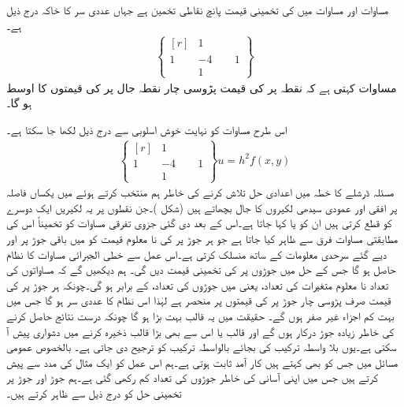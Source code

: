 مساوات  اور مساوات  میں  کی تخمینی قیمت پانچ نقاطی تخمین ہے جہاں  عددی سر کا خاکہ درج ذیل ہے۔
\begin{align}\label{مساوات_اعدادی_جزوی_عمومی_ح}
\left \{ \begin{matrix*}[r] &1&\\1&-4&\phantom{-}1\\&1& \end{matrix*}\right \}
\end{align}
مساوات  کہتی ہے کہ نقطہ  پر  کی قیمت  پڑوسی چار نقطہ جال پر  کی قیمتوں کا اوسط ہو گا۔

اس طرح مساوات  کو نہایت خوش اسلوبی سے درج ذیل لکھا جا سکتا ہے۔ 
\begin{align*}
\left \{ \begin{matrix*}[r] &1&\\1&-4&\phantom{-}1\\&1& \end{matrix*}\right \}u=h^2f(x,y)
\end{align*}
مسئلہ ڈرشلے  کا خطہ  میں اعدادی حل تلاش کرنے کی خاطر  ہم  منتخب کرتے ہوئے  میں  یکساں  فاصلہ پر افقی اور عمودی سیدھی لکیروں کا جال بچھاتے ہیں (شکل )۔جن نقطوں پر یہ لکیریں ایک دوسرے کو قطع کرتی ہیں ان  کو   یا  کہا جاتا ہے۔اس کے بعد دی گئی جزوی تفرقی مساوات کو تخمیناً اس کی مطابقتی مساوات فرق سے ظاہر کیا جاتا ہے جو ہر جوڑ پر  کی نا معلوم قیمت کو  میں باقی جوڑ پر اور دیے گئے سرحدی معلومات کے ساتھ منسلک کرتی ہے۔اس عمل سے خطی الجبرائی مساوات کا نظام حاصل ہو گا جس کے حل  میں  جوڑوں پر  کی تخمینی قیمت دیں گی۔ ہم دیکھیں گے کہ مساواتوں کی تعداد نا معلوم متغیرات کی تعداد، یعنی  میں جوڑوں کی تعداد، کے برابر ہو گی۔چونکہ ہر جوڑ پر  کی قیمت صرف پڑوسی چار جوڑ پر  کی قیمتوں پر منحصر ہے لہٰذا اس نظام کا عددی سر  ہو گا جس میں بہت کم اجزاء غیر صفر ہوں گے۔ حقیقت میں یہ قالب بہت بڑا ہو گا چونکہ درست نتائج حاصل کرنے کی خاطر زیادہ جوڑ درکار ہوں گے اور  قالب یا اس سے بھی بڑا قالب ذخیرہ کرنے میں دشواری پیش آ سکتی ہے۔یوں بلا واسطہ ترکیب کی بجائے  بالواسطہ ترکیب کو ترجیح دی جاتی ہے۔ بالخصوص عمومی مسائل میں   جس کو  بھی کہتے ہیں کار آمد ثابت ہوتی ہے۔ہم اس عمل کو ایک مثال کی مدد سے پیش کرتے ہیں جس میں اپنی  آسانی کی خاطر جوڑوں کی تعداد کم رکھی گئی ہے۔ہم جوڑ اور جوڑ پر تخمینی حل کو درج ذیل سے ظاہر کرتے ہیں۔
